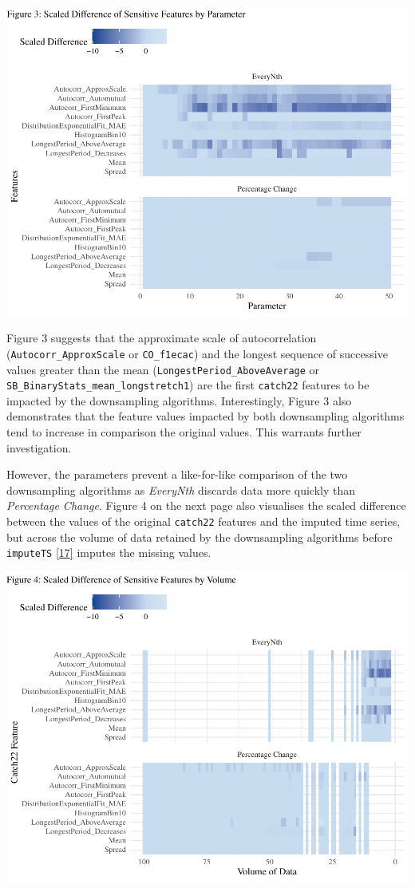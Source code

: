 \documentclass{article}
\begin{document}
\includegraphics{210431461_CSC8639_Dissertation_files/figure-latex/Heatmap_param-1.pdf}

Figure 3 suggests that the approximate scale of autocorrelation
(\texttt{Autocorr\_ApproxScale} or \texttt{CO\_f1ecac}) and the longest
sequence of successive values greater than the mean
(\texttt{LongestPeriod\_AboveAverage} or
\texttt{SB\_BinaryStats\_mean\_longstretch1}) are the first
\texttt{catch22} features to be impacted by the downsampling algorithms.
Interestingly, Figure 3 also demonstrates that the feature values
impacted by both downsampling algorithms tend to increase in comparison
the original values. This warrants further investigation.

However, the parameters prevent a like-for-like comparison of the two
downsampling algorithms as \emph{EveryNth} discards data more quickly
than \emph{Percentage Change}. Figure 4 on the next page also visualises
the scaled difference between the values of the original
\texttt{catch22} features and the imputed time series, but across the
volume of data retained by the downsampling algorithms before
\texttt{imputeTS} \protect\hyperlink{ref-imputeTS_R}{{[}17{]}} imputes
the missing values.

\includegraphics{210431461_CSC8639_Dissertation_files/figure-latex/Heatmap_vol-1.pdf}
\end{document}
